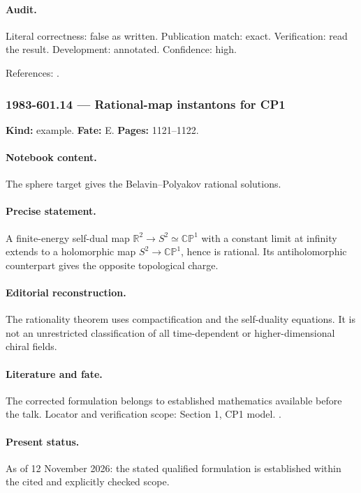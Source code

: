 \paragraph{Audit.} Literal correctness: false as written. Publication match: exact. Verification: read the result. Development: annotated. Confidence: high.

\noindent References: \citep{perelomov1981instantons}.\par

\subsubsection{1983-601.14 --- Rational-map instantons for CP1}

\label{item:1983-601.14}

\noindent\textbf{Kind:} example. \textbf{Fate:} E. \textbf{Pages:} 1121--1122.\par

\paragraph{Notebook content.} The sphere target gives the Belavin--Polyakov rational solutions.

\paragraph{Precise statement.} A finite-energy self-dual map \(\mathbb R^2\to S^2\simeq\mathbb{CP}^1\) with a constant limit at infinity extends to a holomorphic map \(S^2\to\mathbb{CP}^1\), hence is rational. Its antiholomorphic counterpart gives the opposite topological charge.

\paragraph{Editorial reconstruction.} The rationality theorem uses compactification and the self-duality equations. It is not an unrestricted classification of all time-dependent or higher-dimensional chiral fields.

\paragraph{Literature and fate.} The corrected formulation belongs to established mathematics available before the talk. Locator and verification scope: Section 1, CP1 model. \cite{perelomov1981instantons}.

\paragraph{Present status.} As of 12 November 2026: the stated qualified formulation is established within the cited and explicitly checked scope.


